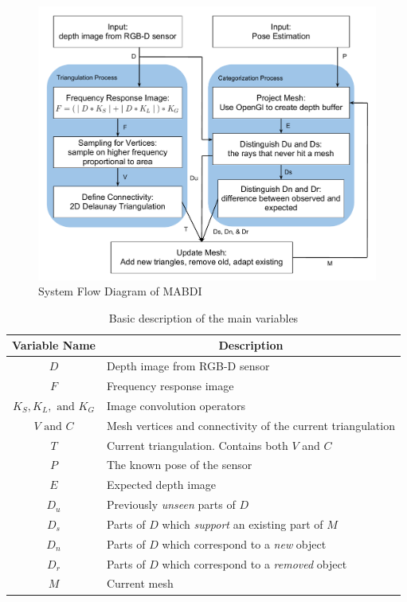 \documentclass[12pt]{article}
\begin{document}
\begin{figure}[h]
  \centering
    \includegraphics[height=0.6\textwidth]{SD.pdf}
  \caption{System Flow Diagram of MABDI}
  \label{fig:SD}
\end{figure}

\begin{table}[h]
\begin{center}
\begin{tabular}{|c|l|}
\hline
{\bf Variable Name} & \multicolumn{1}{|c|}{{\bf Description}} \\
\hline
\rowcolor{LightGray} $D$ & Depth image from RGB-D sensor \\ 
$F$ & Frequency response image \\
\rowcolor{LightGray} $K_S,K_L,\text{ and }K_G$ & Image convolution operators \\
$V \text{ and } C$ & Mesh vertices and connectivity of the current triangulation \\
\rowcolor{LightGray} $T$ & Current triangulation. Contains both $V$ and $C$ \\
$P$ & The known pose of the sensor \\
\rowcolor{LightGray} $E$ & Expected depth image \\ 
$D_u$ & Previously \emph{unseen} parts of $D$ \\ 
\rowcolor{LightGray} $D_s$ & Parts of $D$ which \emph{support} an existing part of
$M$ \\ 
$D_n$ & Parts of $D$ which correspond to a \emph{new} object \\ 
\rowcolor{LightGray} $D_r$ & Parts of $D$ which correspond to a
\emph{removed} object \\ 
$M$ & Current mesh \\
\hline
\end{tabular}
\end{center}
\caption{Basic description of the main variables}
\label{tab:var}
\end{table}
\end{document}
